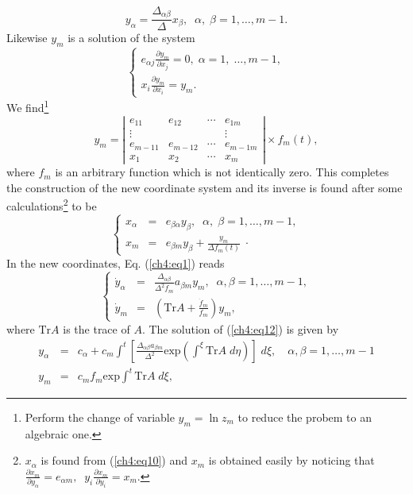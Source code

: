 \begin{equation}
y_{\alpha}=\frac{\Delta_{\alpha \beta}}{\Delta}x_{\beta},
\;\;\alpha,\; \beta=1,\ldots,m-1.
 \label{ch4:eq10}
\end{equation}
Likewise $y_m$ is a solution of the system
\begin{equation}
\label{ch4:eq11}
\left \{  \begin{array}{l}
\displaystyle{e_{\alpha j}\frac{\partial y_m}{\partial x_j}}= 0, 
\; \alpha=1,\;\ldots,m-1, \\
\displaystyle{x_i\frac{\partial y_m}{\partial x_i}}= y_m . 
\end{array} \right.
\end{equation}
We find\footnote{Perform the change of variable $y_m=\ln z_m$ to reduce 
the probem to an algebraic one.}
\[y_m=\left |\begin{array}{cccc}
e_{11} & e_{12} &\cdots& e_{1m}\\ 
\vdots &        &      & \vdots\\
e_{m-1 1}& e_{m-1 2}&\cdots &e_{m-1 m}\\
x_1 & x_2 &\cdots & x_m
\end{array} \right |\times f_m(t),\]
where $f_m$ is an arbitrary function which is not identically zero. 
This completes the construction of the new coordinate system and its 
inverse is found  after some calculations\footnote{$x_{\alpha}$ is found
from (\ref{ch4:eq10}) and $x_m$ is obtained easily by noticing that
$\frac{\partial x_m}{\partial y_{\alpha}}=e_{\alpha m},\;\;
y_i\frac{\partial x_m}{\partial y_i}=x_m. $}
to be 
\[\left\{ \begin{array}{lll}
x_{\alpha} &=& e_{\beta \alpha }y_{\beta},\;\; \alpha,\;\beta=1,\ldots,m-1,\\
x_m &=&\displaystyle{e_{\beta m }y_{\beta}+\frac{y_m}{\Delta f_m(t)}}\;\cdot
\end{array} \right.\]
In the new coordinates, Eq. (\ref{ch4:eq1}) reads
\begin{equation} 
\left \{ \begin{array}{lll}
\dot y_{\alpha} &=& \displaystyle{\frac{\Delta_{\alpha \beta}}
{\Delta^2f_m}a_{\beta m} y_m},\;\; \alpha,\beta=1,\ldots ,m-1,\\
\dot y_m &=&\displaystyle{\left (\mbox{Tr}A+\frac{\dot f_m}{f_m} \right)y_m},
\end{array}\right.  \label{ch4:eq12}
\end{equation}
where $\mbox{Tr} A$ is the trace of $A$. The solution of (\ref{ch4:eq12}) is
given by
\begin{eqnarray*}
y_{\alpha} &=& c_{\alpha}+c_m\int^{t}\left [ \frac{\Delta_{\alpha \beta} 
a_{\beta m}}{\Delta^2}\mbox{exp}\left (\int^{\xi}\mbox{Tr} A\; d\eta 
\right ) \right ]\;d\xi,\quad
 \alpha,\beta=1,\ldots ,m-1 \\ 
y_m &=&c_m f_m\mbox{exp}\int^{t}\mbox{Tr}A\;d\xi,
\end{eqnarray*}
